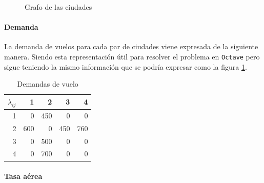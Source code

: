 \documentclass[12pt]{article}
\begin{document}
\vspace{1em}

\begin{figure}[h]
    \centering
    \caption{Grafo de las ciudades}
    \label{fig:cities}
\end{figure}

\paragraph{Demanda}

La demanda de vuelos para cada par de ciudades viene expresada de la siguiente manera. Siendo esta representación útil para resolver el problema en \texttt{Octave} pero sigue teniendo la mismo información que se podría expresar como la figura \ref{fig:cities}.

\begin{table}[h!]
    \centering
    \begin{tabular}{r|r|r|r|r}
        $\lambda_{ij}$%
               &   1  &   2  &   3  &   4\\
            \hline
            \hline
            1  &   0  & 450  &   0  &   0\\
            2  & 600  &   0  & 450  & 760\\
            3  &   0  & 500  &   0  &   0\\
            4  &   0  & 700  &   0  &   0\\
    \end{tabular}
    \caption{Demandas de vuelo}
    \label{tab:demand}
\end{table}

\paragraph{Tasa aérea}
\end{document}

